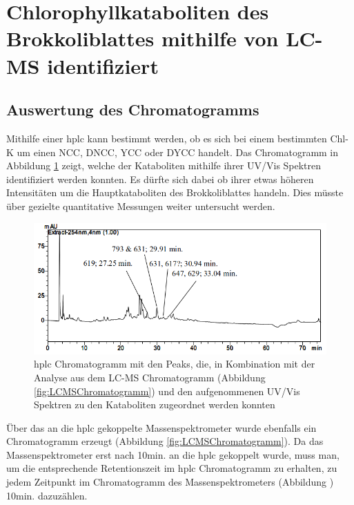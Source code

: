 \section{Chlorophyllkataboliten des Brokkoliblattes mithilfe von LC-MS identifiziert}

\subsection{Auswertung des Chromatogramms}

Mithilfe einer \gls{hplc} kann bestimmt werden, ob es sich bei einem bestimmten \gls{Chl-K} um einen NCC, DNCC, YCC oder DYCC handelt. Das Chromatogramm in Abbildung \ref{fig:HPLCChromatogramm} zeigt, welche der Kataboliten mithilfe ihrer UV/Vis Spektren identifiziert werden konnten. Es dürfte sich dabei ob ihrer etwas höheren Intensitäten um die Hauptkataboliten des Brokkoliblattes handeln. Dies müsste über gezielte quantitative Messungen weiter untersucht werden.

\begin{figure}[!htbp]
  
  \includegraphics[width=\textwidth]{figures/Kapitel6/keineReaktion/VWA_HPLC_Chromatogramm_keineReaktion.png}
  \caption[HPLC Chromatogramm, Quelle: Author]{\gls{hplc} Chromatogramm mit den Peaks, die, in Kombination mit der Analyse aus dem LC-MS Chromatogramm (Abbildung \ref{fig:LCMSChromatogramm}) und den aufgenommenen UV/Vis Spektren zu den Kataboliten zugeordnet werden konnten}
  \label{fig:HPLCChromatogramm}
\end{figure}

Über das an die \gls{hplc} gekoppelte Massenspektrometer wurde ebenfalls ein Chromatogramm erzeugt (Abbildung \ref{fig:LCMSChromatogramm}). Da das Massenspektrometer erst nach 10min. an die \gls{hplc} gekoppelt wurde, muss man, um die entsprechende Retentionszeit im \gls{hplc} Chromatogramm zu erhalten, zu jedem Zeitpunkt im Chromatogramm des Massenspektrometers (Abbildung ) 10min. dazuzählen. 


